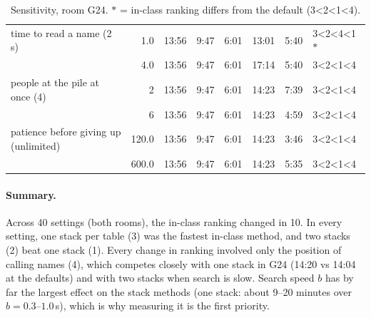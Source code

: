 {\begin{table}[htbp]
\begin{tabular}{lrrrrrrl}
time to read a name (2 s) & 1.0 & 13:56 & 9:47 & 6:01 & 13:01 & 5:40 & 3<2<4<1\,$\ast$ \\
 & 4.0 & 13:56 & 9:47 & 6:01 & 17:14 & 5:40 & 3<2<1<4 \\
people at the pile at once (4) & 2 & 13:56 & 9:47 & 6:01 & 14:23 & 7:39 & 3<2<1<4 \\
 & 6 & 13:56 & 9:47 & 6:01 & 14:23 & 4:59 & 3<2<1<4 \\
patience before giving up (unlimited) & 120.0 & 13:56 & 9:47 & 6:01 & 14:23 & 3:46 & 3<2<1<4 \\
 & 600.0 & 13:56 & 9:47 & 6:01 & 14:23 & 5:35 & 3<2<1<4 \\
\bottomrule
\end{tabular}
\caption{Sensitivity, room G24. $\ast$ = in-class ranking differs from the default (3<2<1<4).}
\end{table}
}

\paragraph{Summary.} Across 40 settings (both rooms), the in-class ranking changed in 10. In every setting, one stack per table (3) was the fastest in-class method, and two stacks (2) beat one stack (1). Every change in ranking involved only the position of calling names (4), which competes closely with one stack in G24 (14:20 vs 14:04 at the defaults) and with two stacks when search is slow. Search speed $b$ has by far the largest effect on the stack methods (one stack: about 9--20 minutes over $b=0.3$--$1.0$\,s), which is why measuring it is the first priority.
